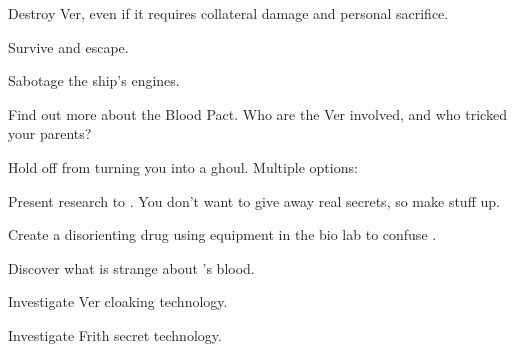 \documentclass[char]{guildcamp4}
\begin{document}
\begin{itemz}[Goals]
	\item Destroy Ver, even if it requires collateral damage and personal sacrifice.
	\item Survive and escape.
	\item Sabotage the ship's engines.
	\item Find out more about the Blood Pact. Who are the Ver involved, and who tricked your parents?
	\item Hold off \cVone{} from turning you into a ghoul. Multiple options:
	\begin {itemz}
	\item Present research to \cVone{}. You don't want to give away real secrets, so make stuff up.
	\item Create a disorienting drug using equipment in the bio lab to confuse \cVone{\them}.
	\end {itemz}
	\item Discover what is strange about \cPlead{}'s blood.
	\item Investigate Ver cloaking technology.
	\item Investigate Frith secret technology.
\end{itemz}

\begin{itemz}[Notes]
	\item 
\end{itemz}

\begin{contacts}
	\contact{\cTest{}}
\end{contacts}
\end{document}
